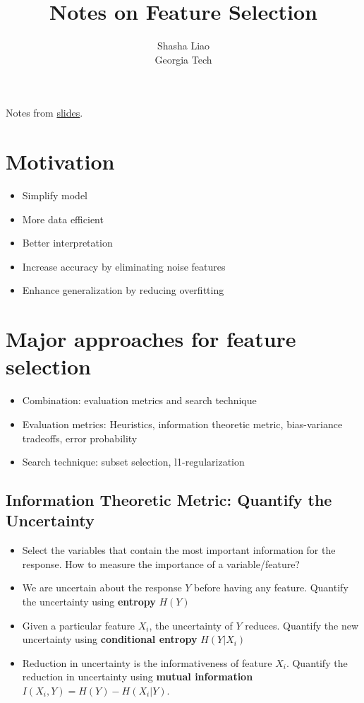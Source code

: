 \documentclass[twoside,12pt]{article}
\begin{document}
\title{Notes on Feature Selection}
\author {Shasha Liao \\ Georgia Tech}
\maketitle
Notes from \href{https://github.com/sliao7/CSE6740_Computational_Data_Analysis/blob/main/slides/feature_selection.pdf}{slides}.
\section{Motivation}
\begin{itemize}
\item Simplify model
\item More data efficient 
\item Better interpretation
\item Increase accuracy by eliminating noise features
\item Enhance generalization by reducing overfitting 
\end{itemize}

\section{Major approaches for feature selection}
\begin{itemize}
\item Combination: evaluation metrics and search technique
\item Evaluation metrics: Heuristics, information theoretic metric, bias-variance tradeoffs, error probability
\item Search technique: subset selection, l1-regularization 
\end{itemize}

\subsection{Information Theoretic Metric: Quantify the Uncertainty}
\begin{itemize}
\item Select the variables that contain the most important information for the response. How to measure the importance of a variable/feature?
\item We are uncertain about the response $Y$ before having any feature. Quantify the uncertainty using \textbf{entropy} $H(Y)$
\item Given a particular feature $X_i$, the uncertainty of $Y$ reduces. Quantify the new uncertainty using \textbf{conditional entropy} $H(Y|X_i)$
\item Reduction in uncertainty is the informativeness of feature $X_i$. Quantify the reduction in uncertainty using \textbf{mutual information} $I(X_i, Y) = H(Y) - H(X_i | Y)$.
\end{itemize}
\end{document}
